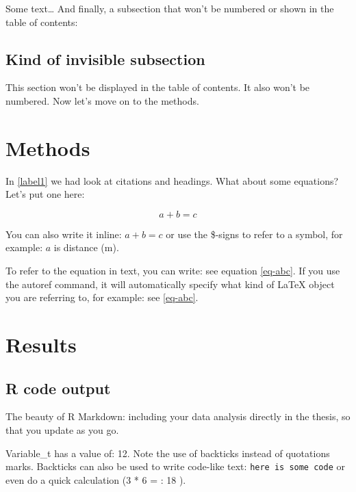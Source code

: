 \documentclass[
  12pt,
]{article}
\begin{document}
Some text\ldots{} And finally, a subsection that won't be numbered or
shown in the table of contents:

\subsection*{Kind of invisible subsection}

This section won't be displayed in the table of contents. It also won't
be numbered. Now let's move on to the methods.

\FloatBarrier
\newpage
{}

\hypertarget{methods}{%
\section{Methods}\label{methods}}

In \autoref{label1} we had look at citations and headings. What about
some equations? Let's put one here:

\begin{equation}
\label{eq-abc}
a + b = c
\end{equation}

You can also write it inline: \(a + b = c\) or use the \$-signs to refer
to a symbol, for example: \(a\) is distance (m).

To refer to the equation in text, you can write: see equation
\ref{eq-abc}. If you use the autoref command, it will automatically
specify what kind of LaTeX object you are referring to, for example: see
\autoref{eq-abc}.

\FloatBarrier
\newpage
{}

\hypertarget{results}{%
\section{Results}\label{results}}

\hypertarget{r-code-output}{%
\subsection{R code output}\label{r-code-output}}

The beauty of R Markdown: including your data analysis directly in the
thesis, so that you update as you go.

Variable\_t has a value of: 12. Note the use of backticks instead of
quotations marks. Backticks can also be used to write code-like text:
\texttt{here\ is\ some\ code} or even do a quick calculation (3 * 6 = :
18 ).
\end{document}
